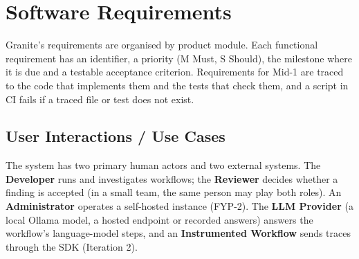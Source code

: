 \chapter{Software Requirements}

Granite's requirements are organised by product module. Each functional requirement has an identifier, a priority (M Must, S Should), the milestone where it is due and a testable acceptance criterion. Requirements for Mid-1 are traced to the code that implements them and the tests that check them, and a script in CI fails if a traced file or test does not exist.

\section{User Interactions / Use Cases}

The system has two primary human actors and two external systems. The \textbf{Developer} runs and investigates workflows; the \textbf{Reviewer} decides whether a finding is accepted (in a small team, the same person may play both roles). An \textbf{Administrator} operates a self-hosted instance (FYP-2). The \textbf{LLM Provider} (a local Ollama model, a hosted endpoint or recorded answers) answers the workflow's language-model steps, and an \textbf{Instrumented Workflow} sends traces through the SDK (Iteration 2).

